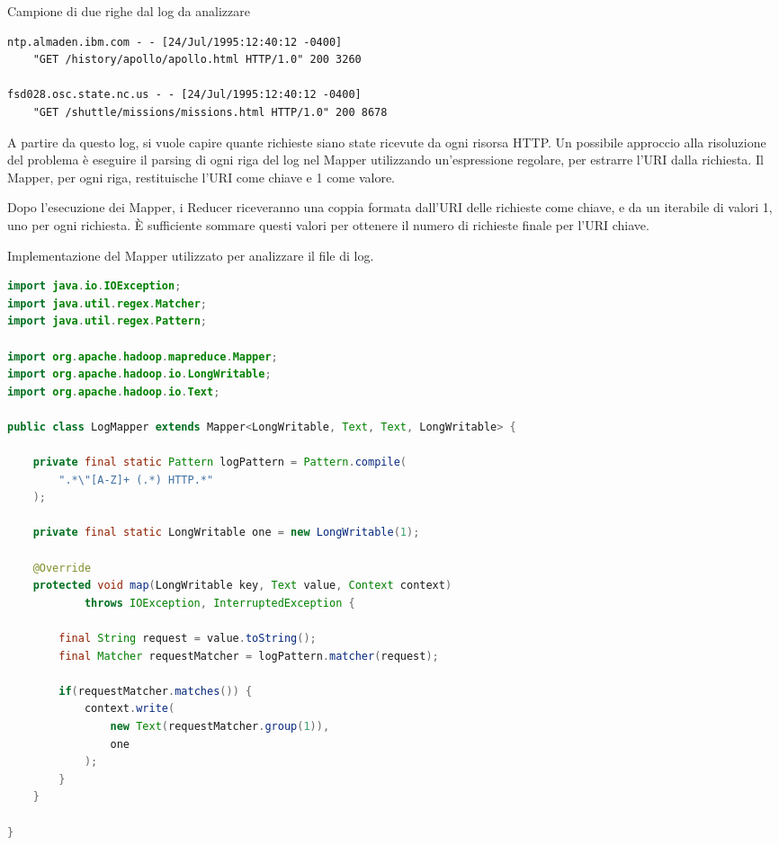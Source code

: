 \documentclass[italian,a4paper, twoside, 12pt]{report}
\begin{document}
\begin{codelisting}

\caption{Campione di due righe dal log da analizzare}

\begin{lstlisting}[label=lst:log-sample]
ntp.almaden.ibm.com - - [24/Jul/1995:12:40:12 -0400] 
    "GET /history/apollo/apollo.html HTTP/1.0" 200 3260

fsd028.osc.state.nc.us - - [24/Jul/1995:12:40:12 -0400]
    "GET /shuttle/missions/missions.html HTTP/1.0" 200 8678
\end{lstlisting}

\end{codelisting}

A partire da questo log, si vuole capire quante richieste siano state
ricevute da ogni risorsa HTTP. Un possibile approccio alla risoluzione
del problema è eseguire il parsing di ogni riga del log nel Mapper
utilizzando un'espressione regolare, per estrarre l'URI dalla richiesta.
Il Mapper, per ogni riga, restituische l'URI come chiave e 1 come
valore.

Dopo l'esecuzione dei Mapper, i Reducer riceveranno una coppia formata
dall'URI delle richieste come chiave, e da un iterabile di valori 1, uno
per ogni richiesta. È sufficiente sommare questi valori per ottenere il
numero di richieste finale per l'URI chiave.

\begin{codelisting}

\caption{Implementazione del Mapper utilizzato per analizzare il file di
log.}

\begin{lstlisting}[language=Java, label=lst:log-mapper]
import java.io.IOException;
import java.util.regex.Matcher;
import java.util.regex.Pattern;

import org.apache.hadoop.mapreduce.Mapper;
import org.apache.hadoop.io.LongWritable;
import org.apache.hadoop.io.Text;

public class LogMapper extends Mapper<LongWritable, Text, Text, LongWritable> {

    private final static Pattern logPattern = Pattern.compile(
        ".*\"[A-Z]+ (.*) HTTP.*"
    );

    private final static LongWritable one = new LongWritable(1);

    @Override
    protected void map(LongWritable key, Text value, Context context)
            throws IOException, InterruptedException {

        final String request = value.toString();
        final Matcher requestMatcher = logPattern.matcher(request);

        if(requestMatcher.matches()) {
            context.write(
                new Text(requestMatcher.group(1)),
                one
            );
        }
    }

}
\end{lstlisting}

\end{codelisting}
\end{document}
